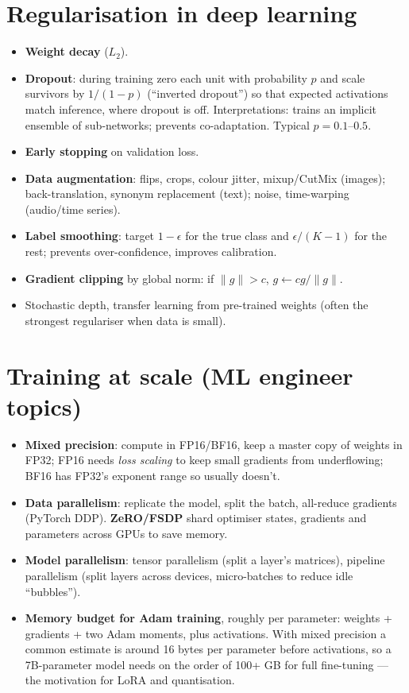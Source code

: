 \section{Regularisation in deep learning}
\begin{itemize}
  \item \textbf{Weight decay} ($L_2$).
  \item \textbf{Dropout}: during training zero each unit with probability $p$ and scale survivors by $1/(1-p)$ (``inverted dropout'') so that expected activations match inference, where dropout is off. Interpretations: trains an implicit ensemble of sub-networks; prevents co-adaptation. Typical $p=0.1$--$0.5$.
  \item \textbf{Early stopping} on validation loss.
  \item \textbf{Data augmentation}: flips, crops, colour jitter, mixup/CutMix (images); back-translation, synonym replacement (text); noise, time-warping (audio/time series).
  \item \textbf{Label smoothing}: target $1-\epsilon$ for the true class and $\epsilon/(K-1)$ for the rest; prevents over-confidence, improves calibration.
  \item \textbf{Gradient clipping} by global norm: if $\|g\|>c$, $g\leftarrow cg/\|g\|$.
  \item Stochastic depth, transfer learning from pre-trained weights (often the strongest regulariser when data is small).
\end{itemize}

\section{Training at scale (ML engineer topics)}
\begin{itemize}
  \item \textbf{Mixed precision}: compute in FP16/BF16, keep a master copy of weights in FP32; FP16 needs \emph{loss scaling} to keep small gradients from underflowing; BF16 has FP32's exponent range so usually doesn't.
  \item \textbf{Data parallelism}: replicate the model, split the batch, all-reduce gradients (PyTorch DDP). \textbf{ZeRO/FSDP} shard optimiser states, gradients and parameters across GPUs to save memory.
  \item \textbf{Model parallelism}: tensor parallelism (split a layer's matrices), pipeline parallelism (split layers across devices, micro-batches to reduce idle ``bubbles'').
  \item \textbf{Memory budget for Adam training}, roughly per parameter: weights + gradients + two Adam moments, plus activations. With mixed precision a common estimate is around 16 bytes per parameter before activations, so a 7B-parameter model needs on the order of 100+ GB for full fine-tuning --- the motivation for LoRA and quantisation.
\end{itemize}

